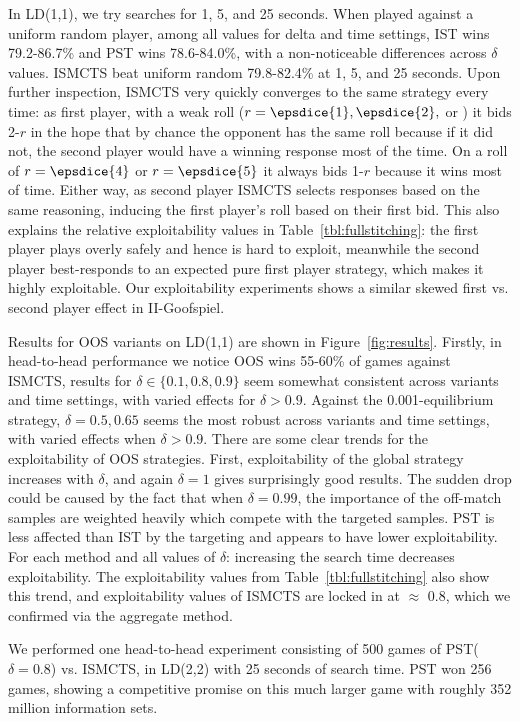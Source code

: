 \documentclass[letterpaper]{article}
\begin{document}
In LD(1,1), we try searches for 1, 5, and 25 seconds. 
When played against a uniform random player, among all values for delta and time settings, 
IST wins 79.2-86.7\% and PST wins 78.6-84.0\%, with a non-noticeable differences across $\delta$ values. 
ISMCTS beat uniform random 79.8-82.4\% at 1, 5, and 25 seconds. 
Upon further inspection, ISMCTS very quickly converges to the same strategy every time: as first player, 
with a weak roll ($r = \epsdice{1}, \epsdice{2},$ or ) it bids 2-$r$ in the hope that by chance the
opponent has the same roll because if it did not, the second player would have a winning response most of the time.
On a roll of $r = \epsdice{4}$ or $r = \epsdice{5}$ it always bids 1-$r$ because it wins most of time. Either way, as 
second player ISMCTS selects responses based on the same reasoning, inducing the first player's roll based on their
first bid. This also explains the relative exploitability values in Table~\ref{tbl:fullstitching}: the first player
plays overly safely and hence is hard to exploit, meanwhile the second player best-responds to an expected pure first 
player strategy, which makes it highly exploitable. 
Our exploitability experiments shows a similar skewed first vs. second player effect in II-Goofspiel. 

Results for OOS variants on LD(1,1) are shown in Figure~\ref{fig:results}. Firstly, in head-to-head performance 
we notice OOS wins 55-60\% of games against ISMCTS, results for $\delta \in \{ 0.1, 0.8, 0.9 \}$ seem somewhat 
consistent across variants and time settings, with varied effects for $\delta > 0.9$. 
Against the 0.001-equilibrium strategy, 
$\delta = 0.5, 0.65$ seems the most robust across variants and time settings, with varied effects when $\delta > 0.9$.
There are some clear trends for the exploitability of OOS strategies. First, exploitability of the global strategy 
increases with $\delta$, and again $\delta = 1$ gives surprisingly good results. 
The sudden drop could be caused by the fact that when $\delta = 0.99$, the 
importance of the off-match samples are weighted heavily which compete with the targeted samples. 
PST is less affected than IST by the targeting and appears to have lower exploitability. 
For each method and all values of $\delta$: increasing the search time decreases exploitability. 
The exploitability values from Table~\ref{tbl:fullstitching} also show this trend, and exploitability values of 
ISMCTS are locked in at $\approx$ 0.8, which we confirmed via the aggregate method.

We performed one head-to-head experiment consisting of 500 games of PST($\delta = 0.8$) vs. ISMCTS, in LD(2,2)
with 25 seconds of search time. 
PST won 256 games, showing a competitive promise on 
this much larger game with roughly 352 million information sets. 
\end{document}
